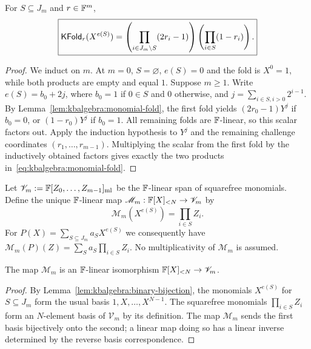 \begin{lemma}\label{lem:kbalgebra:iterated-monomial}
For $S\subseteq J_m$ and $r\in\mathbb{F}^m$,
\begin{equation}\label{eq:kbalgebra:monomial-fold}
 \boxed{\mathsf{KFold}_r(X^{e(S)})=
 \left(\prod_{i\in J_m\setminus S}(2r_i-1)\right)
 \left(\prod_{i\in S}(1-r_i)\right).}
\end{equation}
\end{lemma}
\begin{proof}
We induct on $m$. At $m=0$, $S=\varnothing$, $e(S)=0$ and the fold is $X^0=1$, while both products are empty and equal $1$. Suppose $m\geq1$. Write $e(S)=b_0+2j$, where $b_0=1$ if $0\in S$ and $0$ otherwise, and $j=\sum_{i\in S,i>0}2^{i-1}$. By Lemma~\ref{lem:kbalgebra:monomial-fold}, the first fold yields $(2r_0-1)Y^j$ if $b_0=0$, or $(1-r_0)Y^j$ if $b_0=1$. All remaining folds are $\mathbb{F}$-linear, so this scalar factors out. Apply the induction hypothesis to $Y^j$ and the remaining challenge coordinates $(r_1,\ldots,r_{m-1})$. Multiplying the scalar from the first fold by the inductively obtained factors gives exactly the two products in~\eqref{eq:kbalgebra:monomial-fold}.
\end{proof}

\begin{definition}\label{def:kbalgebra:multilinearization}
Let $\mathscr V_m:=\mathbb{F}[Z_0,\ldots,Z_{m-1}]_{\mathrm{ml}}$ be the $\mathbb{F}$-linear span of squarefree monomials. Define the unique $\mathbb{F}$-linear map $\mathscr M_m:\mathbb{F}[X]_{<N}\to\mathscr V_m$ by
\[
 \mathscr M_m(X^{e(S)})=\prod_{i\in S}Z_i.
\]
For $P(X)=\sum_{S\subseteq J_m}a_SX^{e(S)}$ we consequently have $\mathscr M_m(P)(Z)=\sum_S a_S\prod_{i\in S}Z_i$. No multiplicativity of $\mathscr M_m$ is assumed.
\end{definition}

\begin{lemma}\label{lem:kbalgebra:multilinear-iso}
The map $\mathscr M_m$ is an $\mathbb{F}$-linear isomorphism $\mathbb{F}[X]_{<N}\to\mathscr V_m$.
\end{lemma}
\begin{proof}
By Lemma~\ref{lem:kbalgebra:binary-bijection}, the monomials $X^{e(S)}$ for $S\subseteq J_m$ form the usual basis $1,X,\ldots,X^{N-1}$. The squarefree monomials $\prod_{i\in S}Z_i$ form an $N$-element basis of $\mathscr V_m$ by its definition. The map $\mathscr M_m$ sends the first basis bijectively onto the second; a linear map doing so has a linear inverse determined by the reverse basis correspondence.
\end{proof}

